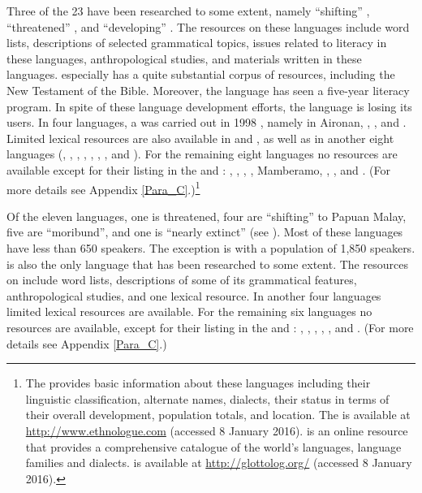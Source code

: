 


Three of the 23  have been researched to some extent, namely  ``shifting'' ,  ``threatened'' , and  ``developing'' . The resources on these languages include word lists, descriptions of selected grammatical topics, issues related to literacy in these languages, anthropological studies, and materials written in these languages.  especially has a quite substantial corpus of resources, including the New Testament of the Bible. Moreover, the language has seen a five-year literacy program. In spite of these language development efforts, the language is losing its users. In four languages, a  was carried out in 1998 {\citep{Clouse.2002}}, namely in Aironan, , , and . Limited lexical resources are also available in  and , as well as in another eight languages (, , , , , , , and ). For the remaining eight languages no resources are available except for their listing in the  {\citep{Lewis.2016b}} and  {\citep{Nordhoff.2013}}: , , , ,  Mamberamo, , , and . (For more details see Appendix \ref{Para_C}.)\footnote{The  \citep{Lewis.2016b} provides basic information about these languages including their linguistic classification, alternate names, dialects, their status in terms of their overall development, population totals, and location. The  is available at \url{http://www.ethnologue.com} (accessed 8 January 2016).  {\citep{Nordhoff.2013}} is an online resource that provides a comprehensive catalogue of the world’s languages, language families and dialects.  is available at \url{http://glottolog.org/} (accessed 8 January 2016).}

Of the eleven  languages, one is threatened, four are  ``shifting'' to Papuan Malay, five are  ``moribund'', and one is  ``nearly extinct'' (see ). Most of these languages have less than 650 speakers. The exception is  with a population of 1,850 speakers.  is also the only  language that has been researched to some extent. The resources on  include word lists, descriptions of some of its grammatical features, anthropological studies, and one lexical resource. In another four languages limited lexical resources are available. For the remaining six languages no resources are available, except for their listing in the  {\citep{Lewis.2016b}} and  \citep{Nordhoff.2013}: , , , , , and . (For more details see Appendix \ref{Para_C}.)

